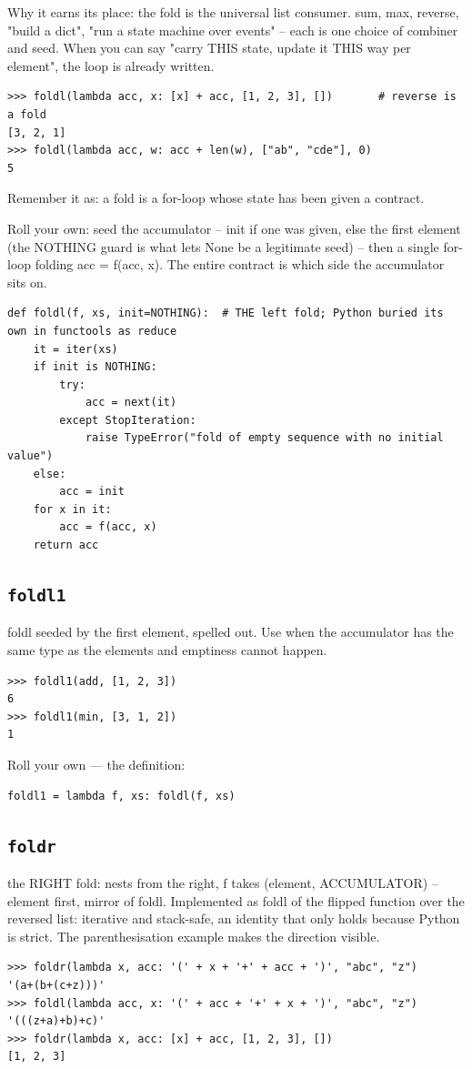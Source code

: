 \documentclass[10pt,letterpaper]{book}
\begin{document}
Why it earns its place: the fold is the universal list consumer. sum, max, reverse, "build a dict", "run a state machine over events" -- each is one choice of combiner and seed. When you can say "carry THIS state, update it THIS way per element", the loop is already written.

\begin{lstlisting}[style=ex]
>>> foldl(lambda acc, x: [x] + acc, [1, 2, 3], [])       # reverse is a fold
[3, 2, 1]
>>> foldl(lambda acc, w: acc + len(w), ["ab", "cde"], 0)
5
\end{lstlisting}

Remember it as: a fold is a for-loop whose state has been given a contract.


Roll your own: seed the accumulator -- init if one was given, else the first element (the NOTHING guard is what lets None be a legitimate seed) -- then a single for-loop folding acc = f(acc, x). The entire contract is which side the accumulator sits on.

\begin{lstlisting}[style=ex]
def foldl(f, xs, init=NOTHING):  # THE left fold; Python buried its own in functools as reduce
    it = iter(xs)
    if init is NOTHING:
        try:
            acc = next(it)
        except StopIteration:
            raise TypeError("fold of empty sequence with no initial value")
    else:
        acc = init
    for x in it:
        acc = f(acc, x)
    return acc
\end{lstlisting}
\subsection{\texttt{foldl1}}\label{def:foldl1}
foldl seeded by the first element, spelled out. Use when the accumulator has the same type as the elements and emptiness cannot happen.
\begin{lstlisting}[style=ex]
>>> foldl1(add, [1, 2, 3])
6
>>> foldl1(min, [3, 1, 2])
1
\end{lstlisting}

Roll your own --- the definition:

\begin{lstlisting}[style=ex]
foldl1 = lambda f, xs: foldl(f, xs)
\end{lstlisting}
\subsection{\texttt{foldr}}\label{def:foldr}
the RIGHT fold: nests from the right, f takes (element, ACCUMULATOR) -- element first, mirror of foldl. Implemented as foldl of the flipped function over the reversed list: iterative and stack-safe, an identity that only holds because Python is strict. The parenthesisation example makes the direction visible.
\begin{lstlisting}[style=ex]
>>> foldr(lambda x, acc: '(' + x + '+' + acc + ')', "abc", "z")
'(a+(b+(c+z)))'
>>> foldl(lambda acc, x: '(' + acc + '+' + x + ')', "abc", "z")
'(((z+a)+b)+c)'
>>> foldr(lambda x, acc: [x] + acc, [1, 2, 3], [])
[1, 2, 3]
\end{lstlisting}
\end{document}
